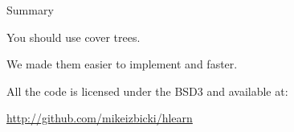 \documentclass{beamer}
\theoremstyle{nameddefinition}
\newcommand\+{\op}
\begin{document}








\begin{frame}[fragile]{Summary}

\Large


You should use cover trees.

\vspace{0.35in}
We made them easier to implement and faster.

\vspace{0.35in}

All the code is licensed under the BSD3 and available at:

\begin{center}
\url{http://github.com/mikeizbicki/hlearn}
\end{center}


\end{frame}



\end{document}

